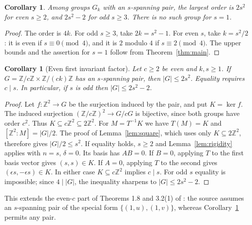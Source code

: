 \documentclass[11pt]{article}
\newtheorem{corollary}[theorem]{Corollary}
\newcommand{\Z}{\mathbb Z}
\newcommand{\Gk}{G_k}
\begin{document}
\begin{corollary}\label{cor:maximum}
Among groups $\Gk$ with an $s$-spanning pair, the largest order is
$2s^2$ for even $s\ge2$, and $2s^2-2$ for odd $s\ge3$.
There is no such group for $s=1$.
\end{corollary}
\begin{proof}
The order is $4k$. For odd $s\ge3$, take $2k=s^2-1$.
For even $s$, take $k=s^2/2$: it is even if $s\equiv0\pmod4$,
and it is $2$ modulo $4$ if $s\equiv2\pmod4$.
The upper bounds and the assertion for $s=1$ follow from
Theorem~\ref{thm:main}.
\end{proof}

\begin{corollary}[Even first invariant factor]\label{cor:even-factor}
Let $c\ge2$ be even and $k,s\ge1$. If
$G=\Z/c\Z\times\Z/(ck)\Z$ has an $s$-spanning pair, then
$|G|\le2s^2$. Equality requires $c\mid s$.
In particular, if $s$ is odd then $|G|\le2s^2-2$.
\end{corollary}
\begin{proof}
Let $f:\Z^2\to G$ be the surjection induced by the pair, and put
$K=\ker f$. The induced surjection $(\Z/c\Z)^2\to G/cG$ is bijective,
since both groups have order $c^2$. Thus $K\subseteq c\Z^2\subseteq2\Z^2$.
For $M=T^{-1}K$ we have $T(M)=K$ and $[\Z^2:M]=|G|/2$.
The proof of Lemma~\ref{lem:square}, which uses only $K\subseteq2\Z^2$,
therefore gives $|G|/2\le s^2$.
If equality holds, $s\ge2$ and Lemma~\ref{lem:rigidity} applies with
$n=s$, $\delta=0$. Its basis has $AB=0$. If $B=0$, applying $T$ to
the first basis vector gives $(s,s)\in K$. If $A=0$, applying $T$ to
the second gives $(\epsilon s,-\epsilon s)\in K$.
In either case $K\subseteq c\Z^2$ implies $c\mid s$.
For odd $s$ equality is impossible; since $4\mid|G|$,
the inequality sharpens to $|G|\le2s^2-2$.
\end{proof}

This extends the even-$c$ part of Theorems 1.8 and 3.2(1) of \cite{BB}:
the source assumes an $s$-spanning pair of the special form
$\{(1,u),(1,v)\}$, whereas Corollary~\ref{cor:even-factor} permits any pair.
\end{document}
